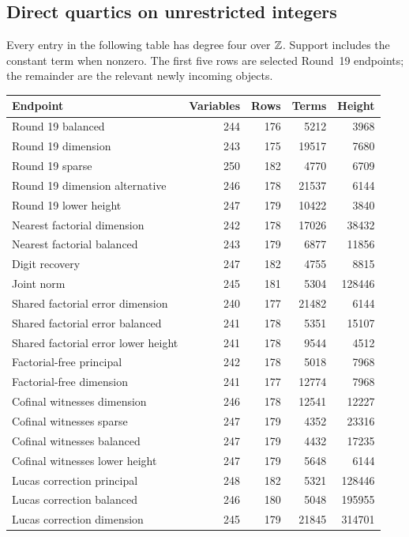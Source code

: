 \subsection{Direct quartics on unrestricted integers}
Every entry in the following table has degree four over $\mathbb Z$. Support
includes the constant term when nonzero. The first five rows are selected
Round~19 endpoints; the remainder are the relevant newly incoming objects.
\begin{center}\small
\begin{tabular}{@{}lrrrr@{}}\toprule
Endpoint & Variables & Rows & Terms & Height\\\midrule
Round 19 balanced &244&176&5212&3968\\
Round 19 dimension &243&175&19517&7680\\
Round 19 sparse &250&182&4770&6709\\
Round 19 dimension alternative &246&178&21537&6144\\
Round 19 lower height &247&179&10422&3840\\\midrule
Nearest factorial dimension &242&178&17026&38432\\
Nearest factorial balanced &243&179&6877&11856\\
Digit recovery &247&182&4755&8815\\
Joint norm &245&181&5304&128446\\
Shared factorial error dimension &240&177&21482&6144\\
Shared factorial error balanced &241&178&5351&15107\\
Shared factorial error lower height &241&178&9544&4512\\
Factorial-free principal &242&178&5018&7968\\
Factorial-free dimension &241&177&12774&7968\\
Cofinal witnesses dimension &246&178&12541&12227\\
Cofinal witnesses sparse &247&179&4352&23316\\
Cofinal witnesses balanced &247&179&4432&17235\\
Cofinal witnesses lower height &247&179&5648&6144\\
Lucas correction principal &248&182&5321&128446\\
Lucas correction balanced &246&180&5048&195955\\
Lucas correction dimension &245&179&21845&314701\\\bottomrule
\end{tabular}
\end{center}


